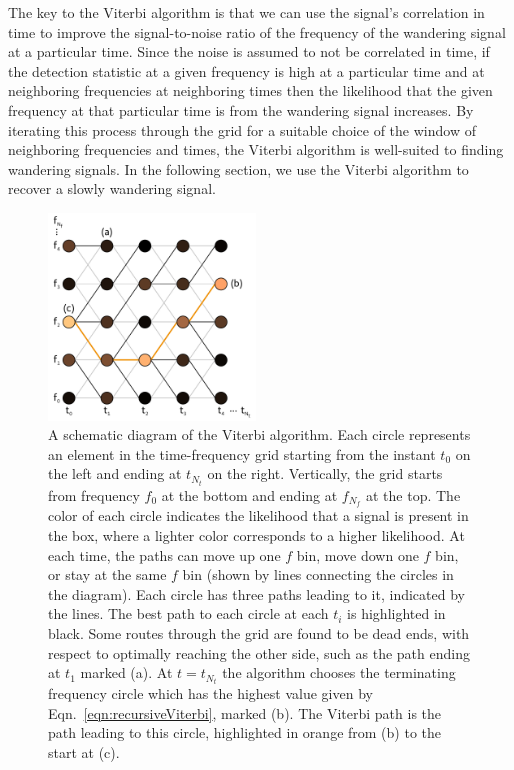 \documentclass[paper-main.tex]{subfiles}
\begin{document}
The key to the Viterbi algorithm is that we can use the signal's correlation in time to improve the signal-to-noise ratio of the frequency of the wandering signal at a particular time. Since the noise is assumed to not be correlated in time, if the detection statistic at a given frequency is high at a particular time and at neighboring frequencies at neighboring times then the likelihood that the given frequency at that particular time is from the wandering signal increases. By iterating this process through the grid for a suitable choice of the window of neighboring frequencies and times, the Viterbi algorithm is well-suited to finding wandering signals.
In the following section, we use the Viterbi algorithm to recover a slowly wandering signal.



\begin{figure}
\includegraphics[width=0.49\textwidth]{figures/viterbiDiagram.pdf}
\caption{\label{fig:viterbi}
A schematic diagram of the Viterbi algorithm. 
Each circle represents an element in the time-frequency grid starting from the instant $t_0$ on the left and ending at $t_{N_t}$ on the right. 
Vertically, the grid starts from frequency $f_0$ at the bottom and ending at $f_{N_f}$ at the top. 
The color of each circle indicates the likelihood that a signal is present in the box, where a lighter color corresponds to a higher likelihood. 
At each time, the paths can move up one $f$ bin, move down one $f$ bin, or stay at the same $f$ bin (shown by lines connecting the circles in the diagram). 
Each circle has three paths leading to it, indicated by the lines. 
The best path to each circle at each $t_i$ is highlighted in black. 
Some routes through the grid are found to be dead ends, with respect to optimally reaching the other side, such as the path ending at $t_1$ marked (a). 
At $t=t_{N_t}$ the algorithm chooses the terminating frequency circle which has the highest value given by Eqn.~\ref{eqn:recursiveViterbi}, marked (b). 
The Viterbi path is the path leading to this circle, highlighted in orange from (b) to the start at (c). 
}
\end{figure}
\end{document}
